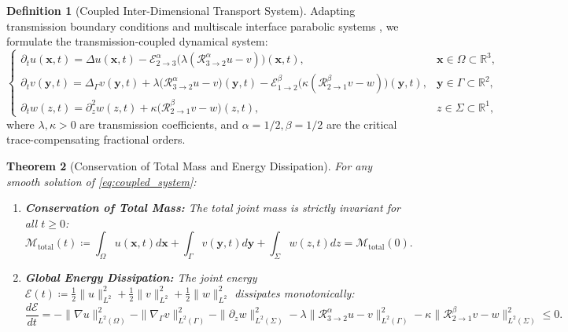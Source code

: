 \documentclass[11pt,a4paper]{article}
\theoremstyle{plain}
\newtheorem{theorem}{Theorem}[section]
\theoremstyle{definition}
\newtheorem{definition}[theorem]{Definition}
\theoremstyle{remark}
\numberwithin{equation}{section}
\begin{document}
\begin{definition}[Coupled Inter-Dimensional Transport System]
Adapting transmission boundary conditions and multiscale interface parabolic systems \cite{evans2010}, we formulate the transmission-coupled dynamical system:
\begin{equation}
\label{eq:coupled_system}
\begin{cases}
\partial_t u(\mathbf{x}, t) = \Delta u(\mathbf{x}, t) - \mathcal{E}_{2 \to 3}^\alpha\big(\lambda (\mathcal{R}_{3 \to 2}^\alpha u - v)\big)(\mathbf{x}, t), & \mathbf{x} \in \Omega \subset \mathbb{R}^3, \\
\partial_t v(\mathbf{y}, t) = \Delta_{\Gamma} v(\mathbf{y}, t) + \lambda \big(\mathcal{R}_{3 \to 2}^\alpha u - v\big)(\mathbf{y}, t) - \mathcal{E}_{1 \to 2}^\beta\big(\kappa (\mathcal{R}_{2 \to 1}^\beta v - w)\big)(\mathbf{y}, t), & \mathbf{y} \in \Gamma \subset \mathbb{R}^2, \\
\partial_t w(z, t) = \partial_z^2 w(z, t) + \kappa \big(\mathcal{R}_{2 \to 1}^\beta v - w\big)(z, t), & z \in \Sigma \subset \mathbb{R}^1,
\end{cases}
\end{equation}
where $\lambda, \kappa > 0$ are transmission coefficients, and $\alpha = 1/2, \beta = 1/2$ are the critical trace-compensating fractional orders.
\end{definition}

\begin{theorem}[Conservation of Total Mass and Energy Dissipation]
For any smooth solution of \eqref{eq:coupled_system}:
\begin{enumerate}
    \item \textbf{Conservation of Total Mass:} The total joint mass is strictly invariant for all $t \ge 0$:
    \begin{equation}
    \mathcal{M}_{\text{total}}(t) \coloneqq \int_\Omega u(\mathbf{x}, t)d\mathbf{x} + \int_\Gamma v(\mathbf{y}, t)d\mathbf{y} + \int_\Sigma w(z, t)dz = \mathcal{M}_{\text{total}}(0).
    \end{equation}
    \item \textbf{Global Energy Dissipation:} The joint energy $\mathcal{E}(t) \coloneqq \frac{1}{2}\|u\|_{L^2}^2 + \frac{1}{2}\|v\|_{L^2}^2 + \frac{1}{2}\|w\|_{L^2}^2$ dissipates monotonically:
    \begin{equation}
    \frac{d\mathcal{E}}{dt} = -\|\nabla u\|_{L^2(\Omega)}^2 - \|\nabla_\Gamma v\|_{L^2(\Gamma)}^2 - \|\partial_z w\|_{L^2(\Sigma)}^2 - \lambda \|\mathcal{R}_{3 \to 2}^\alpha u - v\|_{L^2(\Gamma)}^2 - \kappa \|\mathcal{R}_{2 \to 1}^\beta v - w\|_{L^2(\Sigma)}^2 \le 0.
    \end{equation}
\end{enumerate}
\end{theorem}
\end{document}
